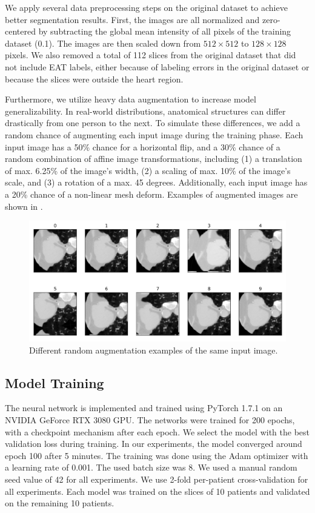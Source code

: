 We apply several data preprocessing steps on the original dataset to achieve better segmentation results. First, the images are all normalized and zero-centered by subtracting the global mean intensity of all pixels of the training dataset (0.1). The images are then scaled down from $512 \times 512$ to $128 \times 128$ pixels. We also removed a total of 112 slices from the original dataset that did not include EAT labels, either because of labeling errors in the original dataset or because the slices were outside the heart region.

Furthermore, we utilize heavy data augmentation to increase model generalizability. In real-world distributions, anatomical structures can differ drastically from one person to the next. To simulate these differences, we add a random chance of augmenting each input image during the training phase. Each input image has a 50\% chance for a horizontal flip, and a 30\% chance of a random combination of affine image transformations, including (1) a translation of max. 6.25\% of the image's width, (2) a scaling of max. 10\% of the image's scale, and (3) a rotation of a max. 45 degrees. Additionally, each input image has a 20\% chance of a non-linear mesh deform. Examples of augmented images are shown in .

\begin{figure}[h]
\center
\includegraphics[width=\textwidth]{images/6/augmentation.png}
\caption{Different random augmentation examples of the same input image. \cite{bencevicEpicardialAdiposeTissue2021}}
\label{fig:augment}
\end{figure}

\subsection{Model Training}

The neural network is implemented and trained using PyTorch 1.7.1 on an NVIDIA GeForce RTX 3080 GPU. The networks were trained for 200 epochs, with a checkpoint mechanism after each epoch. We select the model with the best validation loss during training. In our experiments, the model converged around epoch 100 after 5 minutes. The training was done using the Adam optimizer with a learning rate of 0.001. The used batch size was 8. We used a manual random seed value of 42 for all experiments. We use 2-fold per-patient cross-validation for all experiments. Each model was trained on the slices of 10 patients and validated on the remaining 10 patients.

